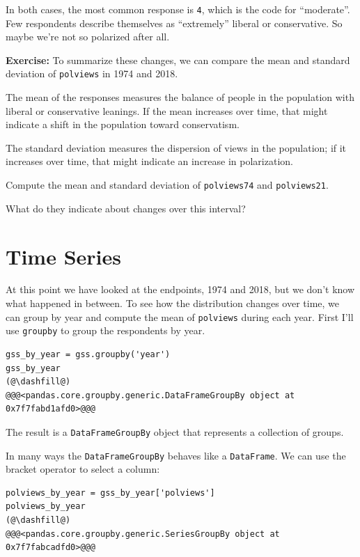 In both cases, the most common response is \passthrough{\lstinline!4!},
which is the code for ``moderate''. Few respondents describe themselves
as ``extremely'' liberal or conservative. So maybe we're not so
polarized after all.

\textbf{Exercise:} To summarize these changes, we can compare the mean
and standard deviation of \passthrough{\lstinline!polviews!} in 1974 and
2018.

The mean of the responses measures the balance of people in the
population with liberal or conservative leanings. If the mean increases
over time, that might indicate a shift in the population toward
conservatism.

The standard deviation measures the dispersion of views in the
population; if it increases over time, that might indicate an increase
in polarization.

Compute the mean and standard deviation of
\passthrough{\lstinline!polviews74!} and
\passthrough{\lstinline!polviews21!}.

What do they indicate about changes over this interval?

\hypertarget{time-series}{%
\section{Time Series}\label{time-series}}

At this point we have looked at the endpoints, 1974 and 2018, but we
don't know what happened in between. To see how the distribution changes
over time, we can group by year and compute the mean of
\passthrough{\lstinline!polviews!} during each year. First I'll use
\passthrough{\lstinline!groupby!} to group the respondents by year.

\begin{lstlisting}[]
gss_by_year = gss.groupby('year')
gss_by_year
(@\dashfill@)
@@@<pandas.core.groupby.generic.DataFrameGroupBy object at 0x7f7fabd1afd0>@@@
\end{lstlisting}

The result is a \passthrough{\lstinline!DataFrameGroupBy!} object that
represents a collection of groups.

In many ways the \passthrough{\lstinline!DataFrameGroupBy!} behaves like
a \passthrough{\lstinline!DataFrame!}. We can use the bracket operator
to select a column:

\begin{lstlisting}[]
polviews_by_year = gss_by_year['polviews']
polviews_by_year
(@\dashfill@)
@@@<pandas.core.groupby.generic.SeriesGroupBy object at 0x7f7fabcadfd0>@@@
\end{lstlisting}


